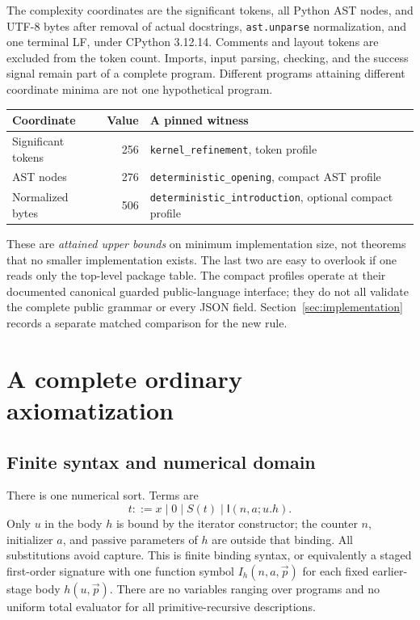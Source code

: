 \documentclass[11pt]{article}
\theoremstyle{definition}
\newcommand{\I}{\mathsf I}
\begin{document}
The complexity coordinates are the significant tokens, all Python AST nodes, and UTF-8 bytes after removal of actual docstrings, \texttt{ast.unparse} normalization, and one terminal LF, under CPython 3.12.14. Comments and layout tokens are excluded from the token count. Imports, input parsing, checking, and the success signal remain part of a complete program. Different programs attaining different coordinate minima are not one hypothetical program.

\begin{center}
\begin{tabular}{lrl}
\toprule
Coordinate & Value & A pinned witness\\
\midrule
Significant tokens & 256 & \texttt{kernel\_refinement}, token profile\\
AST nodes & 276 & \texttt{deterministic\_opening}, compact AST profile\\
Normalized bytes & 506 & \texttt{deterministic\_introduction}, optional compact profile\\
\bottomrule
\end{tabular}
\end{center}

These are \emph{attained upper bounds} on minimum implementation size, not theorems that no smaller implementation exists. The last two are easy to overlook if one reads only the top-level package table. The compact profiles operate at their documented canonical guarded public-language interface; they do not all validate the complete public grammar or every JSON field. Section~\ref{sec:implementation} records a separate matched comparison for the new rule.

\section{A complete ordinary axiomatization}
\label{sec:ordinary}

\subsection{Finite syntax and numerical domain}

There is one numerical sort. Terms are
\[
 t ::= x\mid 0\mid S(t)\mid\I(n,a;u.h).
\]
Only $u$ in the body $h$ is bound by the iterator constructor; the counter $n$, initializer $a$, and passive parameters of $h$ are outside that binding. All substitutions avoid capture. This is finite binding syntax, or equivalently a staged first-order signature with one function symbol $I_h(n,a,\vec p)$ for each fixed earlier-stage body $h(u,\vec p)$. There are no variables ranging over programs and no uniform total evaluator for all primitive-recursive descriptions.
\end{document}
